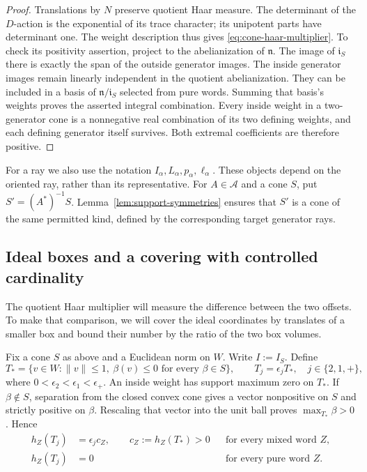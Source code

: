 \begin{proof}
Translations by $N$ preserve quotient Haar measure.  The determinant of the
$D$-action is the exponential of its trace character; its unipotent parts
have determinant one.  The weight description thus gives
\eqref{eq:cone-haar-multiplier}.  To check its positivity assertion, project
to the abelianization of $\mathfrak n$.  The image of $\mathfrak i_S$ there
is exactly the span of the outside generator images.  The inside generator
images remain linearly independent in the quotient abelianization.  They
can be included in a basis of $\mathfrak n/\mathfrak i_S$ selected from pure
words.  Summing that basis's weights proves the asserted integral
combination.  Every inside weight in a two-generator cone is a nonnegative
real combination of its two defining weights, and each defining generator
itself survives.  Both extremal coefficients are therefore positive.
\end{proof}

For a ray we also use the notation $I_\alpha,L_\alpha,p_\alpha,\ell_\alpha$.
These objects depend on the oriented ray, rather than its representative.
For $A\in\mathcal A$ and a cone $S$, put
$S'=(A^*)^{-1}S$.  Lemma~\ref{lem:support-symmetries} ensures that $S'$ is a
cone of the same permitted kind, defined by the corresponding target
generator rays.

\subsection{Ideal boxes and a covering with controlled cardinality}

The quotient Haar multiplier will measure the difference between the two
offsets.  To make that comparison, we will cover the ideal coordinates by
translates of a smaller box and bound their number by the ratio of the
two box volumes.

Fix a cone $S$ as above and a Euclidean norm on $W$.  Write $I:=I_S$.
Define
\[
 T_* = \{v\in W:\|v\|\le1,\ \beta(v)\le0\text{ for every }\beta\in S\},
 \qquad T_j=\epsilon_jT_*,\quad j\in\{2,1,+\},
\]
where $0<\epsilon_2<\epsilon_1<\epsilon_+$.  An inside weight has support
maximum zero on $T_*$.  If $\beta\notin S$, separation from the closed
convex cone gives a vector nonpositive on $S$ and strictly positive on
$\beta$.  Rescaling that vector into the unit ball proves
$\max_{T_*}\beta>0$.  Hence
\begin{equation}
 \begin{aligned}
 h_Z(T_j)&=\epsilon_j c_Z,\qquad c_Z:=h_Z(T_*)>0
       &&\text{for every mixed word }Z,\\
 h_Z(T_j)&=0&&\text{for every pure word }Z.
 \end{aligned}
 \label{eq:cone-word-widths}
\end{equation}

